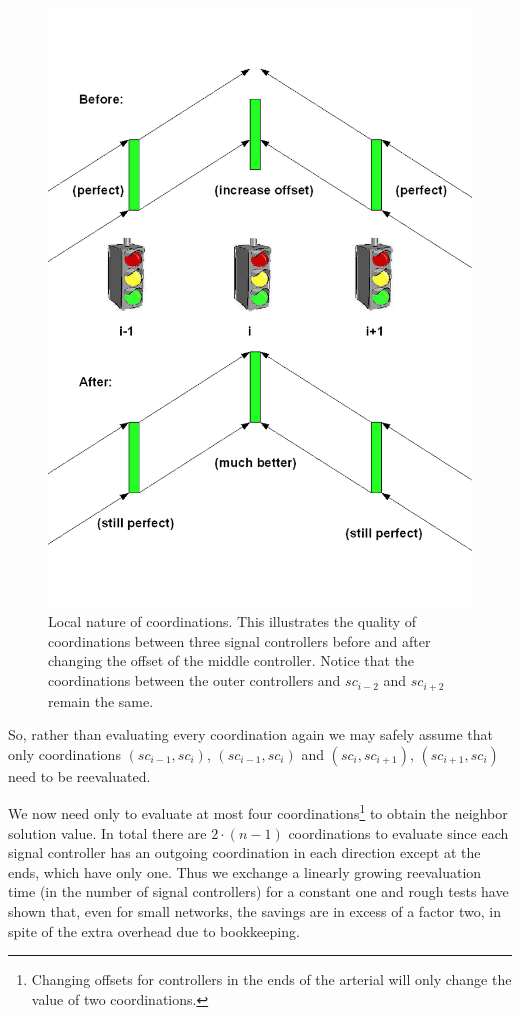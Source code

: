 \begin{figure}[ht]
\centering
\includegraphics[scale=0.3]{delta_eval.png}
\caption{Local nature of coordinations. This illustrates the quality of coordinations between three signal controllers before and after changing the offset of the middle controller. Notice that the coordinations between the outer controllers and $sc_{i-2}$ and $sc_{i+2}$ remain the same.}
\label{fig:delta_eval}
\end{figure}

So, rather than evaluating every coordination again we may safely assume that only coordinations $(sc_{i-1},sc_{i})$, $(sc_{i-1},sc_{i})$ and $(sc_{i},sc_{i+1})$, $(sc_{i+1},sc_{i})$ need to be reevaluated. 

We now need only to evaluate at most four coordinations\footnote{Changing offsets for controllers in the ends of the arterial will only change the value of two coordinations.} to obtain the neighbor solution value. In total there are $2\cdot (n-1)$ coordinations to evaluate since each signal controller has an outgoing coordination in each direction except at the ends, which have only one. Thus we exchange a linearly growing reevaluation time (in the number of signal controllers) for a constant one and rough tests have shown that, even for small networks, the savings are in excess of a factor two, in spite of the extra overhead due to bookkeeping.

